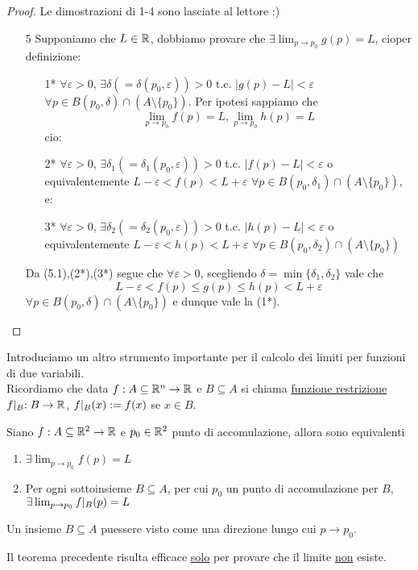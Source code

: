 \begin{proof}
  Le dimostrazioni di 1-4 sono lasciate al lettore :)
  \begin{itemize}
    \item[5] Supponiamo che $L \in \mathbb{R}$, dobbiamo provare che $\exists \lim_{p\to p_0} g(p) = L$, cio\ace per definizione:
    \begin{itemize}
      \item[1*] $\forall \varepsilon > 0 $, $\exists \delta \left(=\delta(p_0, \varepsilon)\right) > 0$ t.c. 
                  $\lvert g(p)-L\rvert < \varepsilon$ $\forall p \in B(p_0,\delta) \cap (A \setminus \{p_0\})$.
                  Per ipotesi sappiamo che 
                  $$\lim_{p\to p_0} f(p) = L, \lim_{p\to p_0} h(p) = L $$
                  cio\ace: 
      \item[2*] $\forall \varepsilon > 0 $, $\exists \delta_1 \left(=\delta_1(p_0, \varepsilon)\right) > 0$ t.c. 
                $\lvert f(p)-L\rvert < \varepsilon$ o equivalentemente 
                $L - \varepsilon < f(p) < L + \varepsilon$ $\forall p \in B(p_0,\delta_1) \cap (A \setminus \{p_0\})$, e:
      \item[3*] $\forall \varepsilon > 0 $, $\exists \delta_2 \left(=\delta_2(p_0, \varepsilon)\right) > 0$ t.c. 
                $\lvert h(p)-L\rvert < \varepsilon$ o equivalentemente
                $L - \varepsilon < h(p) < L + \varepsilon$ $\forall p \in B(p_0,\delta_2) \cap (A \setminus \{p_0\})$
    \end{itemize} 
    Da (5.1),(2*),(3*) segue che $\forall \varepsilon > 0$, scegliendo $\delta = \min\{\delta_1,\delta_2\}$ vale che 
    $$L - \varepsilon < f(p) \leq g(p) \leq h(p) < L+\varepsilon$$ $\forall p \in B(p_0,\delta) \cap (A \setminus \{p_0\})$ 
    e dunque vale la (1*).
  \end{itemize}
\end{proof}
Introduciamo un altro strumento importante per il calcolo dei limiti per funzioni di due variabili. \\
Ricordiamo che data $f: A \subseteq \mathbb{R}^n \to \mathbb{R}$ e $B \subseteq A$ si chiama \underline{funzione restrizione}
$f\lvert_{B} : B \to \mathbb{R}$, $f\lvert_{B}(x) := f(x)$ se $x\in B$.
\begin{theorem}
  Siano $f: A \subseteq \mathbb{R}^2 \to \mathbb{R}$ e $p_0 \in \mathbb{R}^2$ punto di accomulazione, allora sono equivalenti
  \begin{enumerate}
    \item $\exists \lim_{p\to p_0} f(p) = L$
    \item Per ogni sottoinsieme $B \subseteq A$, per cui $p_0$ \ace un punto di accomulazione per $B$,
          $\exists \lim_{p\to p_0} f\lvert_{B}(p) = L$
  \end{enumerate}
\end{theorem}
Un insieme $B\subseteq A$ pu\aco essere visto come una direzione lungo cui $p \to p_0$.
\begin{osservazione}
  Il teorema precedente risulta efficace \underline{solo} per provare che il limite \underline{non} esiste.
\end{osservazione}
